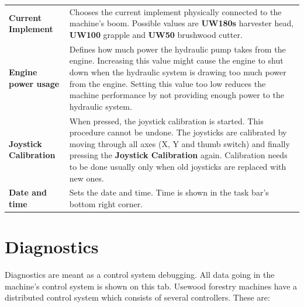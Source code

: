 \documentclass[12pt,a4paper,english]{uvmanual}
\begin{document}
\begin{tabular}{ L{0.2\textwidth} L{0.66\textwidth} }
\textbf{Current Implement} & Chooses the current implement physically connected to the machine's boom. Possible values are \textbf{UW180s} harvester head, \textbf{UW100} grapple and \textbf{UW50} brushwood cutter. \\
\textbf{Engine power usage} & Defines how much power the hydraulic pump takes from the engine. Increasing this value might cause the engine to shut down when the hydraulic system is drawing too much power from the engine. Setting this value too low reduces the machine performance by not providing enough power to the hydraulic system. \\
\textbf{Joystick Calibration} & When pressed, the joystick calibration is started. This procedure cannot be undone. The joysticks are calibrated by moving through all axes (X, Y and thumb switch) and finally pressing the \textbf{Joystick Calibration} again. Calibration needs to be done usually only when old joysticks are replaced with new ones. \\
\textbf{Date and time} & Sets the date and time. Time is shown in the task bar's bottom right corner. \\
\end{tabular}





\section{Diagnostics}\label{ch:system_diagnostics}

Diagnostics are meant as a control system debugging. All data going in the machine's control system is shown on this tab. Usewood forestry machines have a distributed control system which consists of several controllers. These are:
\end{document}
